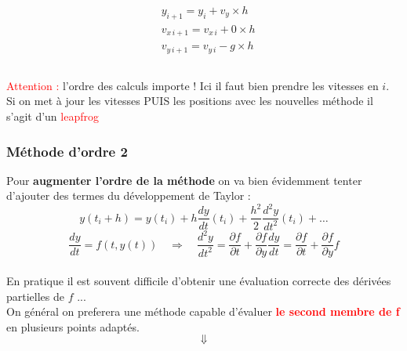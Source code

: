\documentclass{beamer}
\begin{document}
\begin{frame}
\begin{columns}[t]
\begin{column}{0.4\textwidth}
\begin{align*}
& y_{i+1} = y_i + v_y \times h\\
& v_{x\,i+1} = v_{x\,i} + 0 \times h\\
& v_{y\,i+1} = v_{y\,i} - g \times h
\end{align*}
\end{column}
\end{columns}
\vspace{0.1cm}
\textcolor{red}{Attention :} l'ordre des calculs importe ! Ici il faut bien prendre les vitesses en $i$. \\
\vspace{0.1cm}
\scriptsize{Si on met à jour les vitesses PUIS les positions avec les nouvelles méthode il s'agit d'un \textcolor{red}{leapfrog}}

\end{frame}



\begin{frame}
\frametitle{Méthode d'ordre 2}
Pour \textbf{augmenter l'ordre de la méthode} on va bien évidemment tenter d'ajouter des termes du développement de Taylor :\\
\vspace{0.2cm}
\begin{equation*}
	y(t_i + h) = y(t_i) + h \frac{dy}{dt}(t_i) + \frac{h^2}{2}\frac{d^2y}{dt^2}(t_i) + \dots
\end{equation*}
\begin{equation*}
	\frac{dy}{dt} = f(t, y(t)) \quad \Rightarrow \quad \frac{d^2y}{dt^2} = \frac{\partial f}{\partial t} + \frac{\partial f}{\partial y}\frac{dy}{dt} = \frac{\partial f}{\partial t} + \frac{\partial f}{\partial y} f
\end{equation*}
\vspace{0.2cm}\\
En pratique il est souvent difficile d'obtenir une évaluation correcte des dérivées partielles de $f$ ...\\
\vspace{0.5cm}
On général on preferera une méthode capable d'évaluer \textcolor{red}{\textbf{le second membre de f}} en plusieurs points adaptés.
\begin{equation*}
\Downarrow
\end{equation*}

\end{frame}
\end{document}
